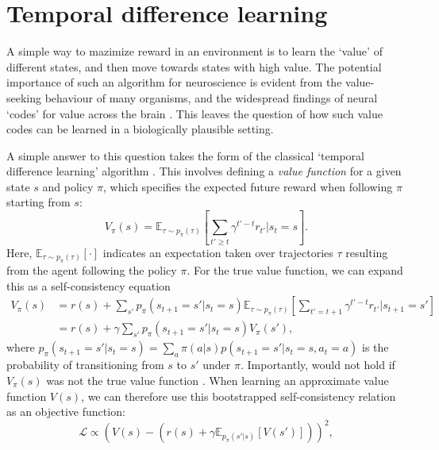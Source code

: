 \section{Temporal difference learning}
\label{sec:temporal_difference}

A simple way to mazimize reward in an environment is to learn the `value' of different states, and then move towards states with high value.
The potential importance of such an algorithm for neuroscience is evident from the value-seeking behaviour of many organisms, and the widespread findings of neural `codes' for value across the brain \citep{rushworth2011frontal}.
This leaves the question of how such value codes can be learned in a biologically plausible setting.

A simple answer to this question takes the form of the classical `temporal difference learning' algorithm \citep{sutton1988learning,sutton2018reinforcement}.
This involves defining a \emph{value function} for a given state $s$ and policy $\pi$, which specifies the expected future reward when following $\pi$ starting from $s$:
\begin{equation}
    \label{eq:V-values}
    V_{\pi}(s) = \mathbb{E}_{\tau \sim p_\pi(\tau)} \left [ \sum_{t' \geq t} \gamma^{t' - t} r_{t'} | s_t = s \right ].
\end{equation}
Here, $\mathbb{E}_{\tau \sim p_\pi(\tau)} [ \cdot ]$ indicates an expectation taken over trajectories $\tau$ resulting from the agent following the policy $\pi$.
For the true value function, we can expand this as a self-consistency equation
\begin{align}
    V_{\pi}(s) &= r(s) + \sum_{s'} p_{\pi}(s_{t+1} = s' | s_t = s) \mathbb{E}_{\tau \sim p_\pi(\tau)} \left [ \sum_{t' = t+1} \gamma^{t' - t} r_{t'} | s_{t+1} = s' \right ] \\
    &=  r(s) + \gamma \sum_{s'} p_{\pi}(s_{t+1} = s' | s_t = s) V_{\pi}(s'),
    \label{eq:value_expansion}
\end{align}
where $p_{\pi}(s_{t+1} = s' | s_t = s) = \sum_a \pi(a|s) p(s_{t+1} = s' | s_t = s, a_t = a)$ is the probability of transitioning from $s$ to $s'$ under $\pi$.
Importantly,  would not hold if $V_{\pi}(s)$ was not the true value function \citep{sutton2018reinforcement}.
%
When learning an approximate value function $V(s)$, we can therefore use this bootstrapped self-consistency relation as an objective function:
\begin{equation}
    \mathcal{L} \propto \left (  V(s) - \left ( r(s) + \gamma \mathbb{E}_{p_\pi(s'|s)} \left [ V(s') \right ] \right ) \right )^2,
\end{equation}
